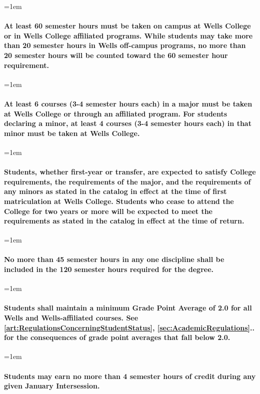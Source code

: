 \documentclass{manual}
\let\oldparagraph\paragraph
\renewcommand\paragraph{\leftskip=1em\oldparagraph}
\begin{document}
			\paragraph{At least 60 semester hours must be taken on campus at Wells College or in Wells College affiliated programs. While students may take more than 20 semester hours in Wells off-campus programs, no more than 20 semester hours will be counted toward the 60 semester hour requirement.}

			\paragraph{At least 6 courses (3-4 semester hours each) in a major must be taken at Wells College or through an affiliated program. For students declaring a minor, at least 4 courses (3-4 semester hours each) in that minor must be taken at Wells College.}

			\paragraph{Students, whether first-year or transfer, are expected to satisfy College requirements, the requirements of the major, and the requirements  of any minors as stated in the catalog in effect at the time of first matriculation at Wells College. Students who cease to attend the College for two years or more will be expected to meet the requirements as stated in the catalog in effect at the time of return.}

			\paragraph{No more than 45 semester hours in any one discipline shall be included   in the 120 semester hours required for the degree.}

			\paragraph{Students shall maintain a minimum Grade Point Average of 2.0 for all Wells and Wells-affiliated courses. See \cref{art:RegulationsConcerningStudentStatus}, \cref{sec:AcademicRegulations}.. for the consequences of grade point averages that fall below 2.0.}

			\paragraph{Students may earn no more than 4 semester hours of credit during any given January Intersession.}
\end{document}
